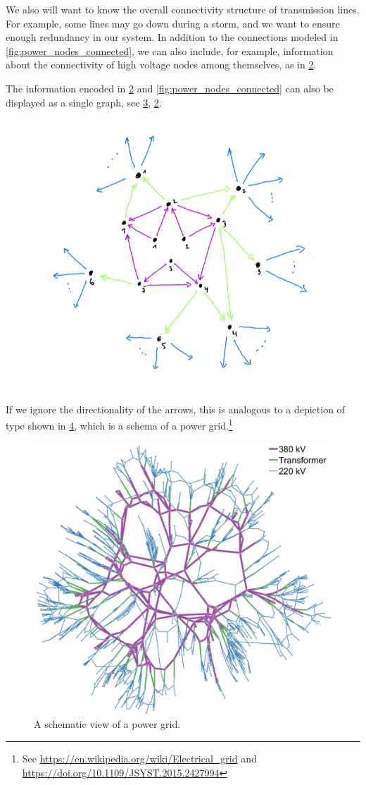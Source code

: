 \begin{figure}[h!]
\centering
{}
 \caption{}
\label{fig:power_paths}
\end{figure}


We also will want to know the overall connectivity structure of transmission lines. For example, some lines may go down during a storm, and we want to ensure enough redundancy in our system. In addition to the connections modeled in \cref{fig:power_nodes_connected}, we can also include, for example, information about the connectivity of high voltage nodes among themselves, as in \cref{fig:power_internodal}.

\begin{figure}[h!]
\centering
 \caption{}
\label{fig:power_internodal}
\end{figure}
The information encoded in \cref{fig:power_internodal} and \cref{fig:power_nodes_connected} can also be displayed as a single graph, see \cref{fig:power_graph},
\cref{fig:power_internodal}.
\begin{figure}[h!]
\centering
 \includegraphics[width=0.5\linewidth]{pics/dist_net_6.png}
 \caption{}
\label{fig:power_graph}
\end{figure}
If we ignore the directionality of the arrows, this is analogous to a depiction of type shown in \cref{fig:power_schema}, which is a schema of a power grid.\footnote{See \url{https://en.wikipedia.org/wiki/Electrical_grid} and \url{https://doi.org/10.1109/JSYST.2015.2427994}}

\begin{figure}[h!]
\centering
 \includegraphics[width=0.5\linewidth]{pics/power_dist_network.png}
 \caption{A schematic view of a power grid.}
\label{fig:power_schema}
\end{figure}




